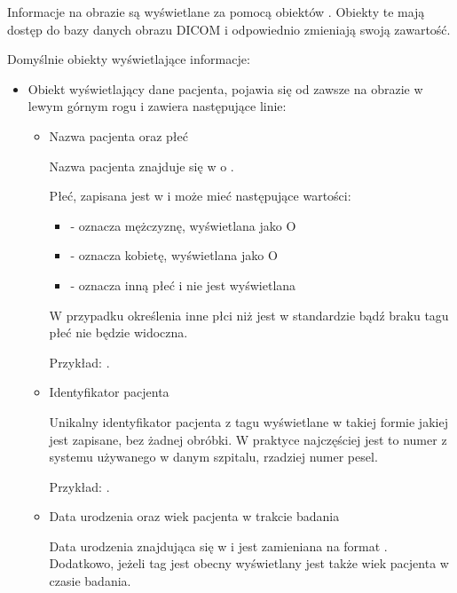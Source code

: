
Informacje na obrazie są wyświetlane za pomocą obiektów .
Obiekty te mają dostęp do bazy danych obrazu DICOM i odpowiednio zmieniają swoją zawartość.

Domyślnie obiekty wyświetlające informacje:
\begin{itemize}

    \item {}

    Obiekt wyświetlający dane pacjenta, pojawia się od zawsze na obrazie w lewym górnym rogu i zawiera następujące linie:
    \begin{itemize}
        \item Nazwa pacjenta oraz płeć

        Nazwa pacjenta znajduje się w  o .
        
        Płeć, zapisana jest w  i może mieć następujące wartości:
        \begin{itemize}
            \item {} - oznacza mężczyznę, wyświetlana jako O
            \item {} - oznacza kobietę, wyświetlana jako O
            \item {} - oznacza inną płeć i nie jest wyświetlana
        \end{itemize}
        
        W przypadku określenia inne płci niż jest w standardzie bądź braku tagu płeć nie będzie widoczna.

        Przykład: .

        \item Identyfikator pacjenta

        Unikalny identyfikator pacjenta z tagu  wyświetlane w takiej formie jakiej jest zapisane, bez żadnej obróbki.
        W praktyce najczęściej jest to numer z systemu używanego w danym szpitalu, rzadziej numer pesel.
        
        Przykład: .

        \item Data urodzenia oraz wiek pacjenta w trakcie badania

        Data urodzenia znajdująca się w  i jest zamieniana na format .
        Dodatkowo, jeżeli tag  jest obecny wyświetlany jest także wiek pacjenta w czasie badania.
    

\end{itemize}
\end{itemize}
